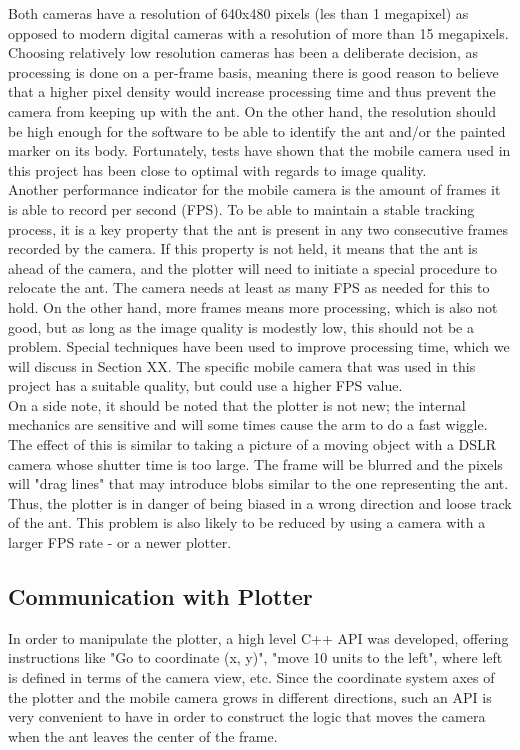Both cameras have a resolution of 640x480 pixels (les than 1 megapixel) as opposed to modern digital cameras with a resolution of more than 15 megapixels. Choosing relatively low resolution cameras has been a deliberate decision, as processing is done on a per-frame basis, meaning there is good reason to believe that a higher pixel density would increase processing time and thus prevent the camera from keeping up with the ant. On the other hand, the resolution should be high enough for the software to be able to identify the ant and/or the painted marker on its body. Fortunately, tests have shown that the mobile camera used in this project has been close to optimal with regards to image quality. \\

Another performance indicator for the mobile camera is the amount of frames it is able to record per second (FPS). To be able to maintain a stable tracking process, it is a key property that the ant is present in any two consecutive frames recorded by the camera. If this property is not held, it means that the ant is ahead of the camera, and the plotter will need to initiate a special procedure to relocate the ant. The camera needs at least as many FPS as needed for this to hold. On the other hand, more frames means more processing, which is also not good, but as long as the image quality is modestly low, this should not be a problem. Special techniques have been used to improve processing time, which we will discuss in Section XX. The specific mobile camera that was used in this project has a suitable quality, but could use a higher FPS value. \\

On a side note, it should be noted that the plotter is not new; the internal mechanics are sensitive and will some times cause the arm to do a fast wiggle. The effect of this is similar to taking a picture of a moving object with a DSLR camera whose shutter time is too large. The frame will be blurred and the pixels will "drag lines" that may introduce blobs similar to the one representing the ant. Thus, the plotter is in danger of being biased in a wrong direction and loose track of the ant. This problem is also likely to be reduced by using a camera with a larger FPS rate - or a newer plotter. \\

\subsection{Communication with Plotter}
In order to manipulate the plotter, a high level C++ API was developed, offering instructions like "Go to coordinate (x, y)", "move 10 units to the left", where left is defined in terms of the camera view, etc. Since the coordinate system axes of the plotter and the mobile camera grows in different directions, such an API is very convenient to have in order to construct the logic that moves the camera when the ant leaves the center of the frame. \\

